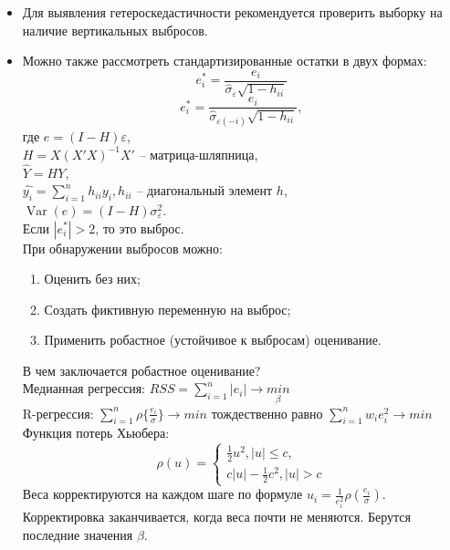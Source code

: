 \documentclass[a0,final]{a0poster}
\DeclareMathOperator{\Var}{Var}
\begin{document}
\begin{multicols}{4}
\begin{itemize}
\item Для выявления гетероскедастичности рекомендуется проверить выборку на наличие вертикальных выбросов.
\item Можно также рассмотреть стандартизированные остатки в двух формах: $$e^*_i = \frac{e_i}{\hat{\sigma}_\varepsilon \sqrt{1 - h_{ii}}}$$ $$e^*_i = \frac{e_i}{\hat{\sigma}_{\varepsilon(-i)} \sqrt{1 - h_{ii}}},$$где
$e = (I - H)\varepsilon,$\\
$H = X(X'X)^{-1}X'$ -- матрица-шляпница,\\
$\hat{Y} = HY, $\\
$\hat{y_i} = \sum\limits_{i=1}^n {h_{ii}y_{i}}, h_{ii}$ -- диагональный элемент $h$,\\
$\Var(e) = (I - H)\sigma^2_\varepsilon.$\\
Если $|e_i^*| > 2$, то это выброс.\\
При обнаружении выбросов можно:
\begin{enumerate}
    \item Оценить без них;
    \item Создать фиктивную переменную на выброс;
    \item Применить робастное (устойчивое к выбросам) оценивание.
\end{enumerate}
В чем заключается робастное оценивание? \\
Медианная регрессия: $RSS = \sum\limits_{i=1}^n{|e_i|} \rightarrow \underset{\beta}{min}$\\
R-регрессия: $\sum\limits_{i=1}^n{\rho\{\frac{e_i}{\sigma}\}} \rightarrow {min}$ тождественно равно $\sum\limits_{i=1}^n{w_ie_i^2} \rightarrow {min}$ \\
Функция потерь Хьюбера:\\
\begin{equation*}
\rho(u) =
 \begin{cases}
   \frac{1}{2}u^2, |u| \leq c,\\
   c|u| - \frac{1}{2}c^2, |u| > c
 \end{cases}
\end{equation*}
Веса корректируются на каждом шаге по формуле $u_i = \frac{1}{e^2_i}\rho(\frac{e_i}{\sigma})$. Корректировка заканчивается, когда веса почти не меняются. Берутся последние значения $\beta$.\\
\end{itemize}


\end{multicols}
\end{document}
